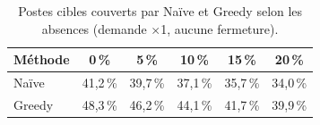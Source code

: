 \begin{table}[H]
    \centering
    \caption{Postes cibles couverts par Naïve et Greedy selon les absences (demande $\times$1, aucune fermeture).}
    \label{tab:sensibilite_methodes}
    \small
    \begin{tabular}{lccccc}
        \toprule
        \textbf{Méthode} & \textbf{0\,\%} & \textbf{5\,\%} & \textbf{10\,\%} & \textbf{15\,\%} & \textbf{20\,\%} \\
        \midrule
        Naïve & 41{,}2\,\% & 39{,}7\,\% & 37{,}1\,\% & 35{,}7\,\% & 34{,}0\,\% \\
        Greedy & 48{,}3\,\% & 46{,}2\,\% & 44{,}1\,\% & 41{,}7\,\% & 39{,}9\,\% \\
        \bottomrule
    \end{tabular}
\end{table}
